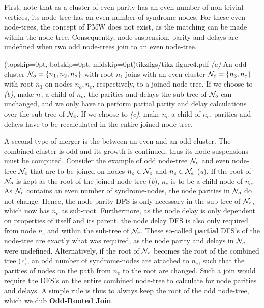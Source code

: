 First, note that as a cluster of even parity has an even number of non-trivial vertices, its node-tree has an even number of syndrome-nodes. For these even node-trees, the concept of PMW does not exist, as the matching can be made within the node-tree. Consequently, node suspension, parity and delays are undefined when two odd node-trees join to an even node-tree. 

\Figure[hbt](topskip=0pt, botskip=0pt, midskip=0pt){tikzfigs/tikz-figure4.pdf}{
    \emph{(a)} An odd cluster $\mathcal{N}_o=\{n_1, n_2, n_o\}$ with root $n_1$ joins with an even cluster $\mathcal{N}_e=\{n_3, n_e\}$ with root $n_3$ on nodes $n_o, n_e$, respectively, to a joined node-tree. If we choose to \emph{(b)}, make $n_e$ a child of $n_o$, the parities and delays the sub-tree of $\mathcal{N}_o$ can unchanged, and we only have to perform partial parity and delay calculations over the sub-tree of $\mathcal{N}_e$. If we choose to \emph{(c)}, make $n_o$ a child of $n_e$, parities and delays have to be recalculated in the entire joined node-tree. \label{fig4}}

A second type of merger is the between an even and an odd cluster. The combined cluster is odd and its growth is continued, thus its node suspensions must be computed. Consider the example of odd node-tree $\mathcal{N}_o$ and even node-tree $\mathcal{N}_e$ that are to be joined on nodes $n_o\in \mathcal{N}_o$ and $n_e \in \mathcal{N}_e$ (\emph{a}). If the root of $\mathcal{N}_o$ is kept as the root of the joined node-tree (\emph{b}), $n_e$ is to be a child node of $n_o$. As $\mathcal{N}_e$ contains an even number of syndrome-nodes, the node parities in $\mathcal{N}_o$ do not change. Hence, the node parity DFS is only necessary in the sub-tree of $\mathcal{N}_e$, which now has $n_e$ as sub-root. Furthermore, as the node delay is only dependent on properties of itself and its parent, the node delay DFS is also only required from node $n_e$ and within the sub-tree of $\mathcal{N}_e$. These so-called \textbf{partial} DFS's of the node-tree are exactly what was required, as the node parity and delays in $\mathcal{N}_e$ were undefined. Alternatively, if the root of $\mathcal{N}_e$ becomes the root of the combined tree (\emph{c}), an odd number of syndrome-nodes are attached to $n_e$, such that the parities of nodes on the path from $n_e$ to the root are changed. Such a join would require the DFS's on the entire combined node-tree to calculate for node parities and delays. A simple rule is thus to always keep the root of the odd node-tree, which we dub \textbf{Odd-Rooted Join}.

